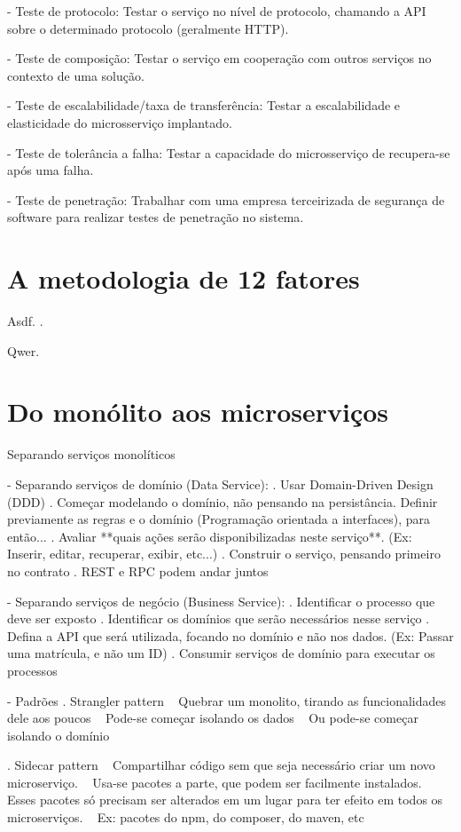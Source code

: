 - Teste de protocolo: Testar o serviço no nível de protocolo, chamando a API sobre o determinado protocolo (geralmente HTTP).

- Teste de composição: Testar o serviço em cooperação com outros serviços no contexto de uma solução.

- Teste de escalabilidade/taxa de transferência: Testar a escalabilidade e elasticidade do microsserviço implantado.

- Teste de tolerância a falha: Testar a capacidade do microsserviço de recupera-se após uma falha.

- Teste de penetração: Trabalhar com uma empresa terceirizada de segurança de software para realizar testes de penetração no sistema.

\section{A metodologia de 12 fatores}

Asdf. \cite{oracle_microservices}.

Qwer. \cite{12factor}

\section{Do monólito aos microserviços}

Separando serviços monolíticos

- Separando serviços de domínio (Data Service):
    . Usar Domain-Driven Design (DDD)
    . Começar modelando o domínio, não pensando na persistância. Definir previamente as regras e o domínio (Programação orientada a interfaces), para então...
    . Avaliar **quais ações serão disponibilizadas neste serviço**. (Ex: Inserir, editar, recuperar, exibir, etc...)
    . Construir o serviço, pensando primeiro no contrato
    . REST e RPC podem andar juntos

- Separando serviços de negócio (Business Service):
    . Identificar o processo que deve ser exposto
    . Identificar os domínios que serão necessários nesse serviço
    . Defina a API que será utilizada, focando no domínio e não nos dados. (Ex: Passar uma matrícula, e não um ID)
    . Consumir serviços de domínio para executar os processos

- Padrões
    . Strangler pattern
        ~ Quebrar um monolito, tirando as funcionalidades dele aos poucos
        ~ Pode-se começar isolando os dados
        ~ Ou pode-se começar isolando o domínio

    . Sidecar pattern
        ~ Compartilhar código sem que seja necessário criar um novo microserviço.
        ~ Usa-se pacotes a parte, que podem ser facilmente instalados.
        ~ Esses pacotes só precisam ser alterados em um lugar para ter efeito em todos os microserviços.
        ~ Ex: pacotes do npm, do composer, do maven, etc

